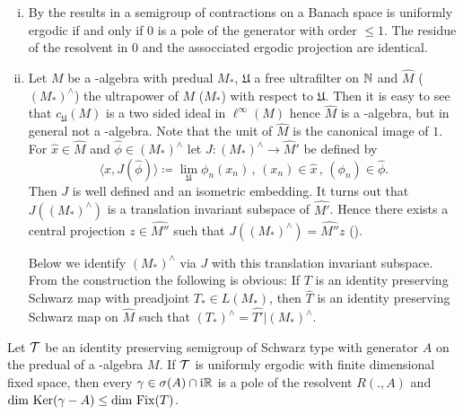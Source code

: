 \begin{remark}\label{rem:d3-2.4}
\begin{enumerate}[(i), wide]
\item
By the results in \citet{lin:1974} a semigroup of contractions on a Banach space is uniformly ergodic if and only if $0$ is a pole of the generator with order $\leq 1$.
The residue of the resolvent in $0$ and the assocciated ergodic projection are identical.

\item
Let $M$ be a \WA-algebra with predual $M_{*}$, $\mathfrak{U}$ a free ultrafilter on $\mathbb{N} $ and $\widehat{M}$ (\resp  $(M_{*})^{\wedge}$) the ultrapower of $M$ (\resp  $M_{*}$) with respect to $\mathfrak{U}$.
Then it is easy to see that $c_{\mathfrak{U}}(M)$ is a two sided ideal in $\ell^{\infty}(M)$ hence $\widehat{M}$ is a \CA-algebra, but in general not a \WA-algebra.
Note that the unit of $\widehat{M}$ is the canonical image of $1$.
For $\hat{x} \in \hat{M}$ and $\hat{\phi} \in (M_{*})^{\wedge}$ let $J: (M_{*})^{\wedge} \to \widehat{M}'$ be defined by
\[
\langle x,J(\hat{\phi}) \rangle \coloneqq \lim_{\mathfrak{U}}\phi_{n}(x_{n}) \, , \, (x_{n}) \in \hat{x} \, , \, (\phi_{n}) \in \hat{\phi} .
\]
Then $J$ is well defined and an isometric embedding.
It turns out that $J((M_{*})^{\wedge})$ is a translation invariant subspace of $\widehat{M'}$.
Hence there exists a central projection $z \in \widehat{M''}$ such that $J((M_{*})^{\wedge}) = \widehat{M''}z$ (\citet[Proposition 2.2]{groh:1984b}).

Below we identify $(M_{*})^{\wedge}$ via $J$ with this translation invariant subspace.
From the construction the following is obvious: If $T$ is an identity preserving Schwarz map with preadjoint $T_{*} \in L(M_{*})$, then $\widehat{T}$ is an identity preserving Schwarz map on $\widehat{M}$ such that $(T_{*})^{\wedge} = \widehat{T'}|(M_{*})^{\wedge}$.
\end{enumerate}
\end{remark}
\begin{theorem}\label{thm:d3-2.5}
Let $\mathcal{T}$ be an identity preserving semigroup of Schwarz type with generator $A$ on the predual of a \WA-algebra $M$.
If $\mathcal{T}$ is uniformly ergodic with finite dimensional fixed space, then every $\gamma \in \sigma(A) \cap \mathrm{i}\mathbb{R}$ is a pole of the resolvent $R(.,A)$ and $\dim \mathop{}\mathrm{Ker}(\gamma - A) \leq \dim \mathop{}\mathrm{Fix}(T)$.
\end{theorem}
